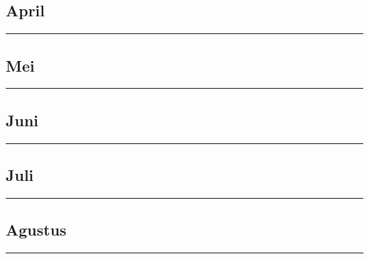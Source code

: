 \documentclass[
]{book}
\begin{document}
\hypertarget{april}{%
\subsection{April}\label{april}}

\begin{center}\rule{0.5\linewidth}{0.5pt}\end{center}

\hypertarget{mei}{%
\subsection{Mei}\label{mei}}

\begin{center}\rule{0.5\linewidth}{0.5pt}\end{center}

\hypertarget{juni}{%
\subsection{Juni}\label{juni}}

\begin{center}\rule{0.5\linewidth}{0.5pt}\end{center}

\hypertarget{juli}{%
\subsection{Juli}\label{juli}}

\begin{center}\rule{0.5\linewidth}{0.5pt}\end{center}

\hypertarget{agustus}{%
\subsection{Agustus}\label{agustus}}

\begin{center}\rule{0.5\linewidth}{0.5pt}\end{center}
\end{document}
